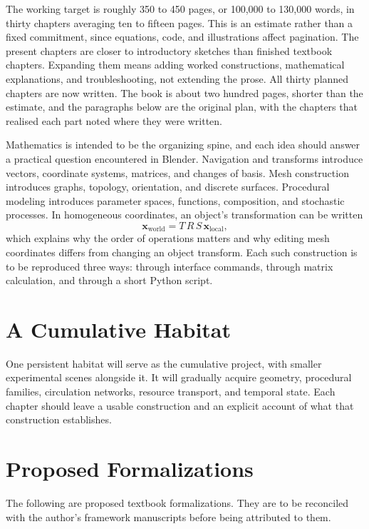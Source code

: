 \documentclass[11pt,openany]{book}
\begin{document}
The working target is roughly 350 to 450 pages, or 100,000 to 130,000 words, in thirty chapters averaging ten to fifteen pages. This is an estimate rather than a fixed commitment, since equations, code, and illustrations affect pagination. The present chapters are closer to introductory sketches than finished textbook chapters. Expanding them means adding worked constructions, mathematical explanations, and troubleshooting, not extending the prose. All thirty planned chapters are now written. The book is about two hundred pages, shorter than the estimate, and the paragraphs below are the original plan, with the chapters that realised each part noted where they were written.

Mathematics is intended to be the organizing spine, and each idea should answer a practical question encountered in Blender. Navigation and transforms introduce vectors, coordinate systems, matrices, and changes of basis. Mesh construction introduces graphs, topology, orientation, and discrete surfaces. Procedural modeling introduces parameter spaces, functions, composition, and stochastic processes. In homogeneous coordinates, an object's transformation can be written
\[
  \mathbf{x}_{\mathrm{world}} = T\,R\,S\,\mathbf{x}_{\mathrm{local}},
\]
which explains why the order of operations matters and why editing mesh coordinates differs from changing an object transform. Each such construction is to be reproduced three ways: through interface commands, through matrix calculation, and through a short Python script.

\section*{A Cumulative Habitat}

One persistent habitat will serve as the cumulative project, with smaller experimental scenes alongside it. It will gradually acquire geometry, procedural families, circulation networks, resource transport, and temporal state. Each chapter should leave a usable construction and an explicit account of what that construction establishes.

\section*{Proposed Formalizations}

The following are proposed textbook formalizations. They are to be reconciled with the author's framework manuscripts before being attributed to them.
\end{document}
